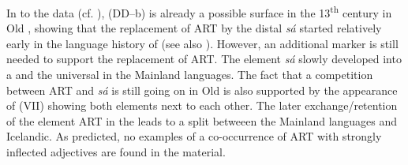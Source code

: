 \documentclass[output=paper,colorlinks,citecolor=brown]{langscibook}
\begin{document}

In  to the  data (cf. \citealp[14]{Pfaff2019}), 
(DD--b) is already a possible surface  in the 13\textsuperscript{th} century in Old
, showing that the replacement of ART by the distal
 \emph{sá} started relatively early in the language
history of  (see also \citealp{StrohWollin2009,StrohWollin2015}). However, an
additional  marker is still needed to support the
replacement of ART. The element \emph{sá} slowly developed into a
 and the universal  in the Mainland
 languages. The fact that a competition between ART and
\emph{sá} is still going on in Old  is also supported by the
appearance of  (VII) showing both elements next to each other.
The later exchange/retention of the element ART in the  leads to a
split betweeen the Mainland  languages and Icelandic. As
predicted, no examples of a co-occurrence of ART with
strongly inflected adjectives are found in the  material.


\largerpage
\end{document}
